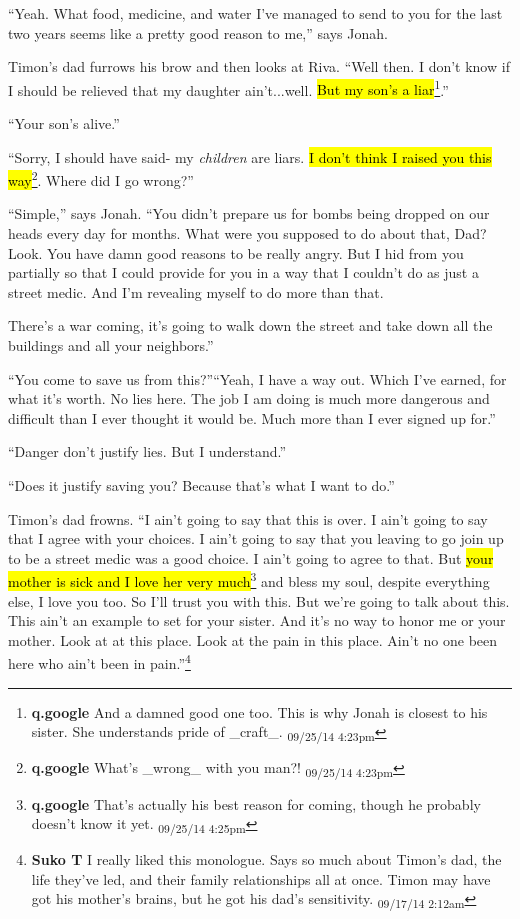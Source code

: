 ``Yeah.  What food, medicine, and water I've managed to send to you for the last two years seems like a pretty good reason to me,'' says Jonah.

Timon's dad furrows his brow and then looks at Riva.  ``Well then.  I don't know if I should be relieved that my daughter ain't...well.  \hl{But my son's a liar}\footnote{\textbf{q.google }And a damned good one too.  This is why Jonah is closest to his sister.  She understands pride of \_craft\_. \textsubscript{09/25/14 4:23pm}}.''

``Your son's alive.''

``Sorry, I should have said- my \textit{children} are liars.  \hl{I don't think I raised you this way}\footnote{\textbf{q.google }What's \_wrong\_ with you man?! \textsubscript{09/25/14 4:23pm}}.  Where did I go wrong?''

``Simple,'' says Jonah.  ``You didn't prepare us for bombs being dropped on our heads every day for months.  What were you supposed to do about that, Dad?  Look.  You have damn good reasons to be really angry.  But I hid from you partially so that I could provide for you in a way that I couldn't do as just a street medic.  And I'm revealing myself to do more than that.  

There's a war coming, it's going to walk down the street and take down all the buildings and all your neighbors.''

``You come to save us from this?''``Yeah, I have a way out.  Which I've earned, for what it's worth.  No lies here.  The job I am doing is much more dangerous and difficult than I ever thought it would be.  Much more than I ever signed up for.''

``Danger don't justify lies.  But I understand.''

``Does it justify saving you?  Because that's what I want to do.''

Timon's dad frowns.  ``I ain't going to say that this is over.  I ain't going to say that I agree with your choices.  I ain't going to say that you leaving to go join up to be a street medic was a good choice.  I ain't going to agree to that.  But \hl{your mother is sick and I love her very much}\footnote{\textbf{q.google }That's actually his best reason for coming, though he probably doesn't know it yet. \textsubscript{09/25/14 4:25pm}} and bless my soul, despite everything else, I love you too.  So I'll trust you with this.  But we're going to talk about this.  This ain't an example to set for your sister.  And it's no way to honor me or your mother.  Look at at this place.  Look at the pain in this place.  Ain't no one been here who ain't been in pain.''\footnote{\textbf{Suko T }I really liked this monologue.  Says so much about Timon's dad, the life they've led, and their family relationships all at once.  Timon may have got his mother's brains, but he got his dad's sensitivity. \textsubscript{09/17/14 2:12am}}

